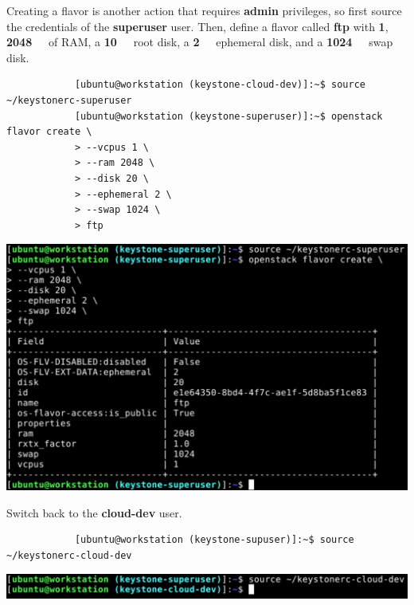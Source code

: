 \documentclass[letterpaper, 12pt]{article}
\begin{document}
\begin{enumerate}
    \begin{labstep}
        Creating a flavor is another action that requires \textbf{admin} privileges, so first source the credentials of the \textbf{superuser} user.
        Then, define a flavor called \textbf{ftp} with \textbf{\qty{1}{\vcpu}}, \textbf{\qty{2048}{\mega\byte}} of RAM, a \textbf{\qty{10}{\giga\byte}} root disk, a \textbf{\qty{2}{\giga\byte}} ephemeral disk, and a \textbf{\qty{1024}{\mega\byte}} swap disk.
        \begin{lstlisting}
            [ubuntu@workstation (keystone-cloud-dev)]:~$ source ~/keystonerc-superuser
            [ubuntu@workstation (keystone-superuser)]:~$ openstack flavor create \
            > --vcpus 1 \
            > --ram 2048 \
            > --disk 20 \
            > --ephemeral 2 \
            > --swap 1024 \
            > ftp
        \end{lstlisting}

        \begin{center}
            \includegraphics[width=\linewidth]{images/part1/step40.png}
        \end{center}
    \end{labstep}

    \begin{labstep}
        Switch back to the \textbf{cloud-dev} user.
        \begin{lstlisting}
            [ubuntu@workstation (keystone-supuser)]:~$ source ~/keystonerc-cloud-dev
        \end{lstlisting}

        \begin{center}
            \includegraphics[width=\linewidth]{images/part1/step41.png}
        \end{center}
    \end{labstep}


\end{enumerate}
\end{document}
